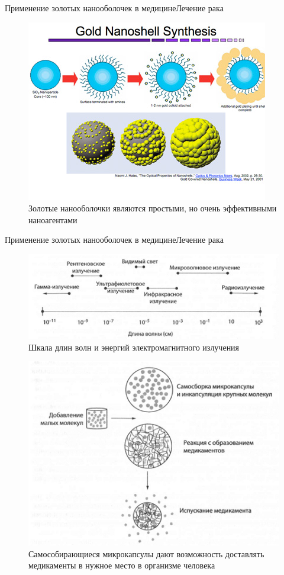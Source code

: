 \documentclass[_Venture_p3.tex]{subfiles}
\begin{document}
\begin{frame}{Применение золотых нанооболочек в медицине}{Лечение рака}
\begin{figure}
	\centering
	\includegraphics[scale=.7]{img/nanoshells}
	\caption{Золотые нанооболочки являются простыми, но очень эффективными наноагентами}
\end{figure}
\end{frame}

\begin{frame}{Применение золотых нанооболочек в медицине}{Лечение рака}
\begin{figure}
	\centering
	\includegraphics[scale=.7]{img/wave_lenghts}
	\caption{Шкала длин волн и энергий электромагнитного излучения}
\end{figure}
\end{frame}

\begin{frame}
\begin{figure}
	\centering
	\includegraphics[scale=.7]{img/microcapsule}
	\caption{Самособирающиеся микрокапсулы дают возможность доставлять медикаменты в нужное место в организме человека}
\end{figure}
\end{frame}
\end{document}
